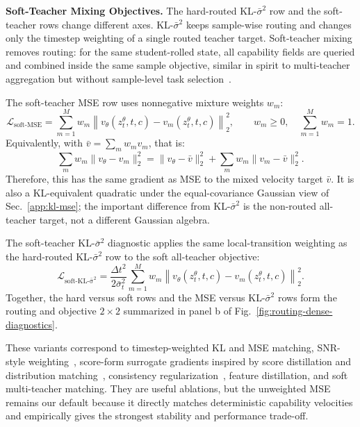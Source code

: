 \noindent\textbf{Soft-Teacher Mixing Objectives.}
The hard-routed KL-$\bar{\sigma}^2$ row and the soft-teacher rows change different axes. KL-$\bar{\sigma}^2$ keeps sample-wise routing and changes only the timestep weighting of a single routed teacher target. Soft-teacher mixing removes routing: for the same student-rolled state, all capability fields are queried and combined inside the same sample objective, similar in spirit to multi-teacher aggregation but without sample-level task selection~\cite{shen2019customizing}.

The soft-teacher MSE row uses nonnegative mixture weights $w_m$:
\begin{equation}
  \mathcal{L}_{\mathrm{soft\text{-}MSE}}
  =\sum_{m=1}^{M}w_m\left\|v_\theta(z_t^\theta,t,c)-v_m(z_t^\theta,t,c)\right\|_2^2,
  \qquad w_m\ge0,\quad \sum_{m=1}^{M}w_m=1.
  \label{eq:app-loss-soft-teacher}
\end{equation}
Equivalently, with $\bar{v}=\sum_m w_m v_m$, that is:
\begin{equation}
  \sum_m w_m\|v_\theta-v_m\|_2^2
  =\|v_\theta-\bar{v}\|_2^2+
    \sum_m w_m\|v_m-\bar{v}\|_2^2.
  \label{eq:app-soft-mse-equivalence}
\end{equation}
Therefore, this has the same gradient as MSE to the mixed velocity target $\bar{v}$. It is also a KL-equivalent quadratic under the equal-covariance Gaussian view of Sec.~\ref{app:kl-mse}; the important difference from KL-$\bar{\sigma}^2$ is the non-routed all-teacher target, not a different Gaussian algebra.

The soft-teacher KL-$\bar{\sigma}^2$ diagnostic applies the same local-transition weighting as the hard-routed KL-$\bar{\sigma}^2$ row to the soft all-teacher objective:
\begin{equation}
  \mathcal{L}_{\mathrm{soft\text{-}KL\text{-}\bar{\sigma}^2}}
  =\frac{\Delta t^2}{2\bar{\sigma}_t^2}
    \sum_{m=1}^{M}w_m\left\|v_\theta(z_t^\theta,t,c)-v_m(z_t^\theta,t,c)\right\|_2^2.
  \label{eq:app-loss-soft-kl-sigma}
\end{equation}
Together, the hard versus soft rows and the MSE versus KL-$\bar{\sigma}^2$ rows form the routing and objective $2\times2$ summarized in panel b of Fig.~\ref{fig:routing-dense-diagnostics}.

These variants correspond to timestep-weighted KL and MSE matching, SNR-style weighting~\cite{hang2023efficient}, score-form surrogate gradients inspired by score distillation and distribution matching~\cite{poole2022dreamfusion,sauer2024adversarial,sauer2024fast,yin2024one}, consistency regularization~\cite{song2023consistency,kim2024consistency}, feature distillation, and soft multi-teacher matching. They are useful ablations, but the unweighted MSE remains our default because it directly matches deterministic capability velocities and empirically gives the strongest stability and performance trade-off.

